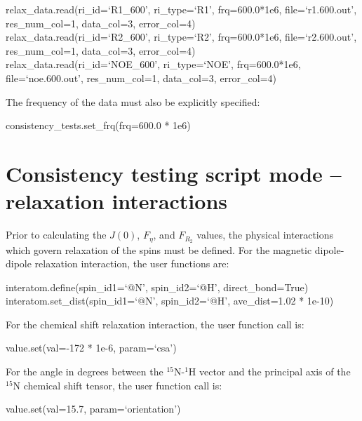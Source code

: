 \begin{exampleenv}
relax\_data.read(ri\_id=`R1\_600',  ri\_type=`R1',  frq=600.0*1e6, file=`r1.600.out', res\_num\_col=1, data\_col=3, error\_col=4) \\
relax\_data.read(ri\_id=`R2\_600',  ri\_type=`R2',  frq=600.0*1e6, file=`r2.600.out', res\_num\_col=1, data\_col=3, error\_col=4) \\
relax\_data.read(ri\_id=`NOE\_600', ri\_type=`NOE', frq=600.0*1e6, file=`noe.600.out', res\_num\_col=1, data\_col=3, error\_col=4)
\end{exampleenv}

The frequency of the data must also be explicitly specified:

\begin{exampleenv}
consistency\_tests.set\_frq(frq=600.0 * 1e6) \\
\end{exampleenv}




\section{Consistency testing script mode -- relaxation interactions}

Prior to calculating the $J(0)$, $F_\eta$, and $F_{R_2}$ values, the physical interactions which govern relaxation of the spins must be defined.  For the magnetic dipole-dipole relaxation interaction, the user functions are:

\begin{exampleenv}
interatom.define(spin\_id1=`@N', spin\_id2=`@H', direct\_bond=True) \\
interatom.set\_dist(spin\_id1=`@N', spin\_id2=`@H', ave\_dist=1.02 * 1e-10)
\end{exampleenv}

For the chemical shift relaxation interaction, the user function call is:

\begin{exampleenv}
value.set(val=-172 * 1e-6, param=`csa')
\end{exampleenv}

For the angle in degrees between the $^{15}$N-$^1$H vector and the principal axis of the $^{15}$N chemical shift tensor, the user function call is:

\begin{exampleenv}
value.set(val=15.7, param=`orientation')
\end{exampleenv}


